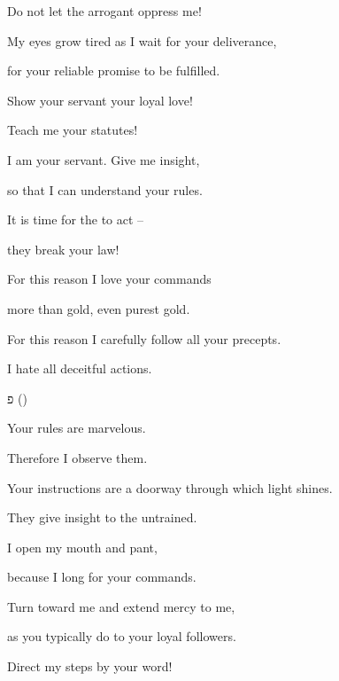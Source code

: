 {\par }{\Q Do not
let the arrogant
oppress me!
\par }{\Q {}My
eyes
grow tired
as I wait for your deliverance,
\par }{\Q for your reliable
promise to be fulfilled.
\par }{\Q {}Show
your servant
your loyal love!

\par }{\Q Teach
me your statutes!
\par }{\Q {}I am
your servant.
Give me insight,
\par }{\Q so that I
can understand
your rules.
\par }{\Q {}It is time
for the
{} to act –
\par }{\Q they break your law!
\par }{\Q {}For this reason
I love
your commands
\par }{\Q more than gold,
even purest gold.
\par }{\Q {}For this reason
I carefully follow all
your precepts.
\par }{\Q I hate
all
deceitful
actions.
\par }{\SH פ ({})
\par }{\Q {}Your rules are marvelous.
\par }{\Q Therefore I observe them.
\par }{\Q {}Your instructions
are a doorway
through which light
shines.

\par }{\Q They give insight
to the untrained.
\par }{\Q {}I open my mouth
and pant,
\par }{\Q because I long for
your commands.
\par }{\Q {}Turn
toward
me and extend mercy
to me,
\par }{\Q as you typically
do to your loyal
followers.
\par }{\Q {}Direct
my steps by
your word!

}
